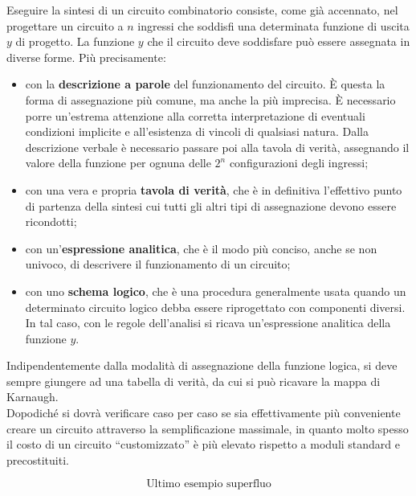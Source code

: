 \documentclass[a4paper]{extarticle}
\newcommand{\quotes}[1]{``#1''}
\begin{document}
\noindent
Eseguire la sintesi di un circuito combinatorio consiste, come già accennato, nel progettare un circuito a \(n\) ingressi che soddisfi una determinata funzione di uscita \(y\) di progetto. La funzione \(y\) che il circuito deve soddisfare può essere assegnata in diverse forme. Più precisamente:

\begin{itemize}
    \item con la \textbf{descrizione a parole} del funzionamento del circuito. È questa la forma di assegnazione più comune, ma anche la più imprecisa. È necessario porre un’estrema attenzione alla corretta interpretazione di eventuali condizioni implicite e all’esistenza di vincoli di qualsiasi natura. Dalla descrizione verbale è necessario passare poi alla tavola di verità, assegnando il valore della funzione per ognuna delle \(2^n\) configurazioni degli ingressi;

    \item con una vera e propria \textbf{tavola di verità}, che è in definitiva l’effettivo punto di partenza della sintesi cui tutti gli altri tipi di assegnazione devono essere ricondotti;

    \item con un’\textbf{espressione analitica}, che è il modo più conciso, anche se non univoco, di descrivere il funzionamento di un circuito;

    \item con uno \textbf{schema logico}, che è una procedura generalmente usata quando un determinato circuito logico debba essere riprogettato con componenti diversi. In tal caso, con le regole dell’analisi si ricava un’espressione analitica della funzione $y$.
\end{itemize}

\noindent
Indipendentemente dalla modalità di assegnazione della funzione logica, si deve sempre giungere ad una tabella di verità, da cui si può ricavare la mappa di Karnaugh.\\
Dopodiché si dovrà verificare caso per caso se sia effettivamente più conveniente creare un circuito attraverso la semplificazione massimale, in quanto molto spesso il costo di un circuito \quotes{customizzato} è più elevato rispetto a moduli standard e precostituiti.

\[\text{Ultimo esempio superfluo}\]

\vspace{1em}
\end{document}
